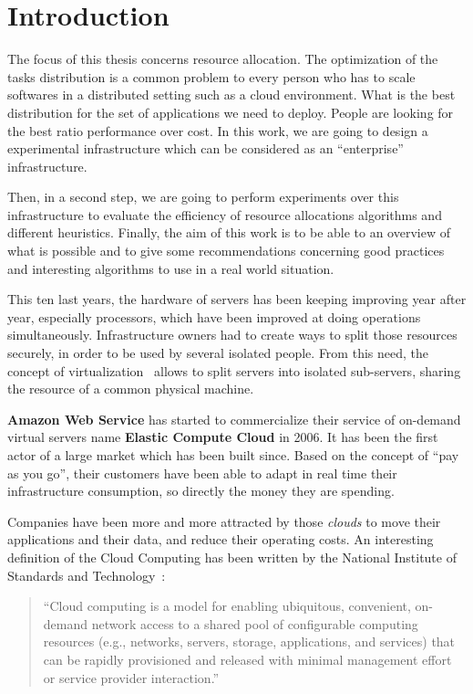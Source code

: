 \section*{Introduction}

The focus of this thesis concerns resource allocation. The optimization of the
tasks distribution is a common problem to every person who has to scale
softwares in a distributed setting such as a cloud environment. What is the
best distribution for the set of applications we need to deploy. People are
looking for the best ratio performance over cost. In this work, we are going to
design a experimental infrastructure which can be considered as an
``enterprise'' infrastructure.

Then, in a second step, we are going to perform experiments over this
infrastructure to evaluate the efficiency of resource allocations algorithms
and different heuristics. Finally, the aim of this work is to be able to an
overview of what is possible and to give some recommendations concerning good
practices and interesting algorithms to use in a real world situation.

This ten last years, the hardware of servers has been keeping improving year
after year, especially processors, which have been improved at doing operations
simultaneously. Infrastructure owners had to create ways to split those
resources securely, in order to be used by several isolated people.  From this
need, the concept of virtualization~\cite{virtualisation}
allows to split servers into isolated sub-servers, sharing the resource of a
common physical machine.

\textbf{Amazon Web Service} has started to commercialize their service of
on-demand virtual servers name \textbf{Elastic Compute Cloud} in 2006. It
has been the first actor of a large market which has been built since. Based on
the concept of ``pay as you go'', their customers have been able to adapt in real time
their infrastructure consumption, so directly the money they are spending.

Companies have been more and more attracted by those \textit{clouds} to move
their applications and their data, and reduce their operating costs. An
interesting definition of the Cloud Computing has been written by the National
Institute of Standards and Technology~\citep*{nistcloudcomputing}:

\begin{quote}
	“Cloud computing is a model for enabling ubiquitous, convenient, on-demand
	network access to a shared pool of configurable computing resources (e.g.,
	networks, servers, storage, applications, and services) that can be rapidly
	provisioned and released with minimal management effort or service provider
	interaction.”
\end{quote}

